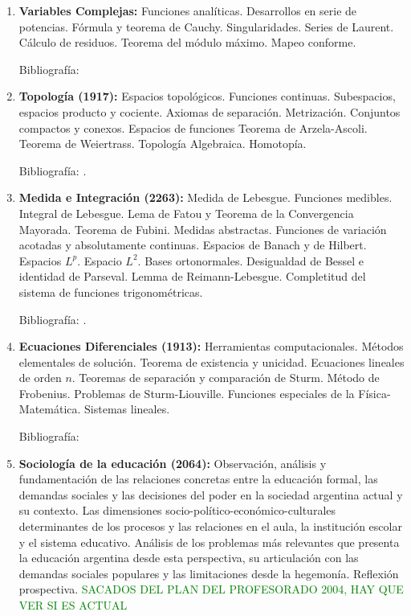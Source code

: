 \documentclass[a4paper, 12pt]{article}
\begin{document}
\begin{enumerate}
\item\textbf{Variables Complejas:}
Funciones analíticas. Desarrollos en serie de potencias. Fórmula
y teorema de Cauchy. Singularidades. Series de Laurent. Cálculo de
residuos. Teorema del módulo máximo. Mapeo conforme.

Bibliografía: \cite{ahlfors, churchill,conway}



\item\textbf{Topología (1917):}  Espacios topológicos. Funciones continuas. Subespacios, espacios producto
y cociente. Axiomas de separación. Metrización.
Conjuntos compactos y conexos. Espacios de funciones Teorema de Arzela-Ascoli. Teorema de Weiertrass. 
 Topología Algebraica. Homotopía.

Bibliografía: \cite{dugundji, kelley,
munkres, morris1989topology,  JohnMcCleary84,StefanWaldmann87,JohnB.Conway251, RobertAConover507}.


\item\textbf{Medida e Integración (2263):}  Medida de Lebesgue. Funciones medibles.
Integral de
Lebesgue. Lema de Fatou y Teorema de la Convergencia Mayorada.
Teorema de Fubini. Medidas abstractas.  Funciones de variación acotadas y absolutamente continuas.   Espacios de Banach y de Hilbert. Espacios
$L^p$. Espacio  $L^2$. Bases ortonormales. 
Desigualdad de Bessel e identidad de Parseval. Lemma de Reimann-Lebesgue. Completitud del sistema de funciones trigonométricas.

Bibliografía: \cite{favazo, loeve, rudin, EliasM.Stein105,TerenceTao123,A.N.Kolmogorov682,DavidM.Bressoud121,wheeden2015measure}.


\item\textbf{Ecuaciones Diferenciales (1913):} Herramientas computacionales. Métodos elementales de solución. Teorema de existencia y unicidad.  Ecuaciones lineales de orden $n$. Teoremas de separación y comparación de Sturm. Método de Frobenius.  Problemas de Sturm-Liouville. Funciones especiales de la Física-Matemática.  Sistemas lineales. 

Bibliografía: \cite{ GeorgeFinlaySimmons487,WilliamE.Boyce496, MorrisW.Hirsch540,JorgeSotomayor513,BarbaraD.MacCluer515,RichardS.Palais519,GarrettBirkhoff526}



\item\textbf{Sociología de la educación (2064):}  Observación, análisis y fundamentación de las relaciones concretas entre la educación formal, las demandas sociales y las decisiones del poder en la sociedad argentina actual y su contexto. Las dimensiones socio-político-económico-culturales determinantes de los procesos y las relaciones en el aula, la institución escolar y el sistema educativo. Análisis de los problemas más relevantes que presenta la educación argentina desde esta perspectiva, su articulación con las demandas sociales populares y las limitaciones desde la hegemonía. Reflexión prospectiva. \textcolor{green}{SACADOS DEL PLAN DEL PROFESORADO 2004, HAY QUE VER SI ES ACTUAL}








\end{enumerate}
\end{document}
